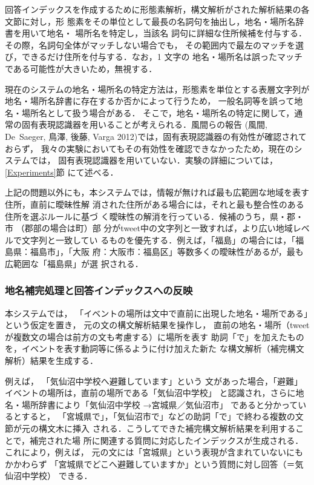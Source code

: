 \documentclass[japanese]{jnlp_1.4}
\begin{document}
回答インデックスを作成するために形態素解析，構文解析がされた解析結果の各文節に対し，形
態素をその単位として最長の名詞句を抽出し，地名・場所名辞書を用いて地名・
場所名を特定し，当該名
詞句に詳細な住所候補を付与する．その際，名詞句全体がマッチしない場合でも，
その範囲内で最左のマッチを選び，できるだけ住所を付与する．なお，1 文字の
地名・場所名は誤ったマッチである可能性が大きいため，無視する．

現在のシステムの地名・場所名の特定方法は，形態素を単位とする表層文字列が
地名・場所名辞書に存在するか否かによって行うため，
一般名詞等を誤って地名・場所名として扱う場合がある．
そこで，地名・場所名の特定に関して，通常の固有表現認識器を用いることが考えられる．風間らの報告
    (風間, De~Saeger, 鳥澤, 後藤, Varga 2012)\nocite{Kazama2012b}では，固有表現認識器の有効性が確認されておらず，
我々の実験においてもその有効性を確認できなかったため，現在のシステムでは，
固有表現認識器を用いていない．実験の詳細については，\ref{Experiments}節
にて述べる．

上記の問題以外にも，本システムでは，情報が無ければ最も広範囲な地域を表す住所，直前に曖昧性解
消された住所がある場合には，それと最も整合性のある住所を選ぶルールに基づ
く曖昧性の解消を行っている．候補のうち，県・郡・市 （郡部の場合は町）部
分がtweet中の文字列と一致すれば，より広い地域レベルで文字列と一致してい
るものを優先する．例えば，「福島」の場合には，「福島県：福島市」，「大阪
府：大阪市：福島区」等数多くの曖昧性があるが，最も広範囲な「福島県」が選
択される．


\subsubsection{地名補完処理と回答インデックスへの反映}

本システムでは，
「イベントの場所は文中で直前に出現した地名・場所である」という仮定を置き，
元の文の構文解析結果を操作し，
直前の地名・場所（tweetが複数文の場合は前方の文も考慮する）に場所を表す
助詞「で」を加えたものを，イベントを表す動詞等に係るように付け加えた新た
な構文解析（補完構文解析）結果を生成する．

例えば，
「気仙沼中学校へ避難しています」という
文があった場合，「避難」イベントの場所は，直前の場所である「気仙沼中学校」
と認識され，さらに地名・場所辞書により「気仙沼中学校 →宮城県／気仙沼市」
であると分かっているとすると，
「宮城県で」，「気仙沼市で」などの助詞「で」で終わる複数の文節が元の構文木に挿入
される．こうしてできた補完構文解析結果を利用することで，補完された場
所に関連する質問に対応したインデックスが生成される．これにより，例えば，
元の文には「宮城県」という表現が含まれていないにもかかわらず
「宮城県でどこへ避難していますか」という質問に対し回答（＝気仙沼中学校）
できる．
\end{document}
